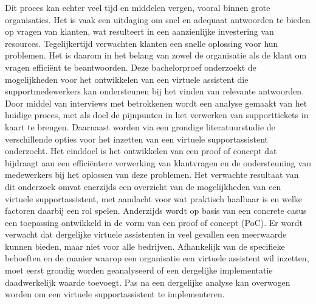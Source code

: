 Dit proces kan echter veel tijd en middelen vergen, vooral binnen grote organisaties. Het is vaak een uitdaging
om snel en adequaat antwoorden te bieden op vragen van klanten, wat resulteert in een aanzienlijke investering
van resources. Tegelijkertijd verwachten klanten een snelle oplossing voor hun problemen. Het is daarom in het
belang van zowel de organisatie als de klant om vragen efficiënt te beantwoorden.
Deze bachelorproef onderzoekt de mogelijkheden voor het ontwikkelen van een virtuele assistent die supportmedewerkers
kan ondersteunen bij het vinden van relevante antwoorden. Door middel van interviews met betrokkenen
wordt een analyse gemaakt van het huidige proces, met als doel de pijnpunten in het verwerken van
supporttickets in kaart te brengen. Daarnaast worden via een grondige literatuurstudie de verschillende opties
voor het inzetten van een virtuele supportassistent onderzocht. Het einddoel is het ontwikkelen van een proof of
concept dat bijdraagt aan een efficiëntere verwerking van klantvragen en de ondersteuning van medewerkers
bij het oplossen van deze problemen.
Het verwachte resultaat van dit onderzoek omvat enerzijds een overzicht van de mogelijkheden van een virtuele
supportassistent, met aandacht voor wat praktisch haalbaar is en welke factoren daarbij een rol spelen. Anderzijds
wordt op basis van een concrete casus een toepassing ontwikkeld in de vorm van een proof of concept (PoC).
Er wordt verwacht dat dergelijke virtuele assistenten in veel gevallen een meerwaarde kunnen bieden, maar niet
voor alle bedrijven. Afhankelijk van de specifieke behoeften en de manier waarop een organisatie een virtuele
assistent wil inzetten, moet eerst grondig worden geanalyseerd of een dergelijke implementatie daadwerkelijk
waarde toevoegt. Pas na een dergelijke analyse kan overwogen worden om een virtuele supportassistent te
implementeren.
